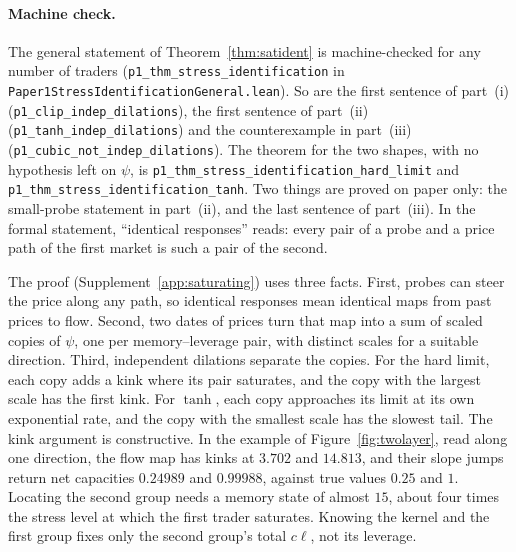 \paragraph{Machine check.} The general statement of Theorem~\ref{thm:satident} is machine-checked for any number of traders (\texttt{p1\_thm\_stress\_identification} in \nolinkurl{Paper1StressIdentificationGeneral.lean}). So are the first sentence of part~(i) (\texttt{p1\_clip\_indep\_dilations}), the first sentence of part~(ii) (\texttt{p1\_tanh\_indep\_dilations}) and the counterexample in part~(iii) (\texttt{p1\_cubic\_not\_indep\_dilations}). The theorem for the two shapes, with no hypothesis left on $\psi$, is \nolinkurl{p1_thm_stress_identification_hard_limit} and \nolinkurl{p1_thm_stress_identification_tanh}. Two things are proved on paper only: the small-probe statement in part~(ii), and the last sentence of part~(iii). In the formal statement, ``identical responses'' reads: every pair of a probe and a price path of the first market is such a pair of the second.

The proof (Supplement~\ref{app:saturating}) uses three facts. First, probes can steer the price along any path, so identical responses mean identical maps from past prices to flow. Second, two dates of prices turn that map into a sum of scaled copies of $\psi$, one per memory--leverage pair, with distinct scales for a suitable direction. Third, independent dilations separate the copies. For the hard limit, each copy adds a kink where its pair saturates, and the copy with the largest scale has the first kink. For $\tanh$, each copy approaches its limit at its own exponential rate, and the copy with the smallest scale has the slowest tail. The kink argument is constructive. In the example of Figure~\ref{fig:twolayer}, read along one direction, the flow map has kinks at $3.702$ and $14.813$, and their slope jumps return net capacities $0.24989$ and $0.99988$, against true values $0.25$ and $1$. Locating the second group needs a memory state of almost $15$, about four times the stress level at which the first trader saturates. Knowing the kernel and the first group fixes only the second group's total $c\ell$, not its leverage.

